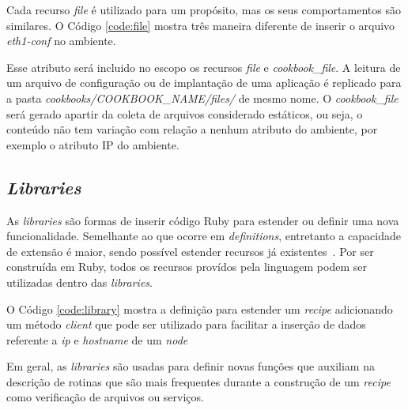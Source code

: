 Cada recurso \textit{file} é utilizado para um propósito, mas os seus comportamentos
são similares. O Código \ref{code:file} mostra três maneira diferente de
inserir o arquivo \textit{eth1-conf} no ambiente.

\begin{minipage}{.90\textwidth}
  \lstset{style=shell}
  
\end{minipage}

Esse atributo será incluido no escopo os recursos \textit{file} e \textit{cookbook\_file}.
A leitura de um arquivo de configuração ou de implantação de uma aplicação 
é replicado para a pasta \textit{cookbooks/COOKBOOK\_NAME/files/} de mesmo nome.
O \textit{cookbook\_file} será gerado apartir da coleta de arquivos considerado estáticos,
ou seja, o conteúdo não tem variação com relação a nenhum atributo do ambiente,
por exemplo o atributo IP do ambiente.

\subsection{\textit{Libraries}}

As \textit{libraries} são formas de inserir código Ruby para estender ou definir
uma nova funcionalidade. Semelhante ao que ocorre em \textit{definitions}, entretanto a
capacidade de extensão é maior, sendo possível estender recursos já
existentes~\cite{chefdoc:2016}. Por ser construída em Ruby, todos os
recursos provídos pela linguagem podem ser utilizadas dentro das
\textit{libraries}.

O Código \ref{code:library} mostra a definição para estender um
\textit{recipe} adicionando um método \textit{client} que pode ser utilizado
para facilitar a inserção de dados referente a \textit{ip} e \textit{hostname} de um
\textit{node}

\begin{minipage}{.90\textwidth}
  \lstset{style=shell}
  
\end{minipage}

Em geral, as \textit{libraries} são usadas para definir novas funções que
auxiliam na descrição de rotinas que são mais frequentes durante a
construção de um \textit{recipe} como verificação de arquivos ou serviços.

